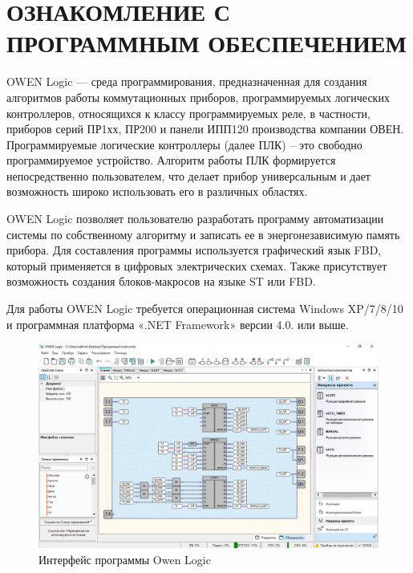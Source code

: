 \chapter{ОЗНАКОМЛЕНИЕ С ПРОГРАММНЫМ ОБЕСПЕЧЕНИЕМ}
OWEN Logic --- среда программирования, предназначенная для создания алгоритмов работы коммутационных приборов, программируемых логических контроллеров, относящихся к классу программируемых реле, в частности, приборов серий ПР1хх, ПР200 и панели ИПП120 производства компании ОВЕН. Программируемые логические контроллеры (далее ПЛК) -- это свободно программируемое устройство. Алгоритм работы ПЛК формируется непосредственно пользователем, что делает прибор универсальным и дает возможность широко использовать его в различных областях.

OWEN Logic позволяет пользователю разработать программу автоматизации системы по собственному алгоритму и записать ее в энергонезависимую память прибора. Для составления программы используется графический язык FBD, который применяется в цифровых электрических схемах. Также присутствует возможность создания блоков-макросов на языке ST или FBD.

Для работы OWEN Logic требуется операционная система Windows XP/7/8/10 и программная платформа «.NET Framework» версии 4.0. или выше.

\begin{figure}[hb]
    \centering
    \includegraphics[width=1\textwidth]{fig/owen_logic.png}
    \caption{Интерфейс программы Owen Logic}
    \label{fig:owenlogic}
\end{figure}

\newpage
